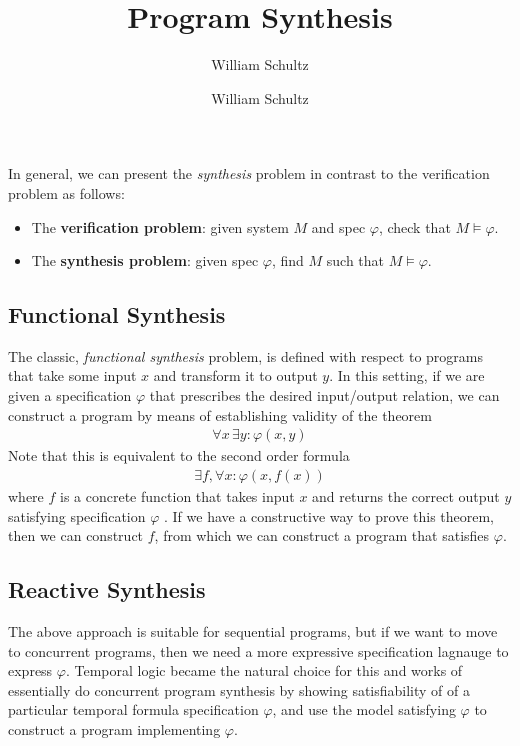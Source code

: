 \documentclass[10pt,a4paper]{article}
\author{William Schultz}
\begin{document}
\title{Program Synthesis}
\author{William Schultz}
\maketitle


In general, we can present the \textit{synthesis} problem in contrast to the verification problem as follows:
\begin{itemize}
    \item The \textbf{verification problem}: given system $M$ and spec $\varphi$, check that $M \vDash \varphi$.
    \item The \textbf{synthesis problem}: given spec $\varphi$, find $M$ such that $M \vDash \varphi$.
\end{itemize}

\subsection{Functional Synthesis}

The classic, \textit{functional synthesis} problem, is defined with respect to programs that take some input $x$ and transform it to output $y$. In this setting, if we are given a specification $\varphi$ that prescribes the desired input/output relation, we can construct a program by means of establishing validity of the theorem
\begin{align*}
    \forall x \, \exists y : \varphi(x,y)
\end{align*}
Note that this is equivalent to the second order formula
\begin{align*}
    \exists f, \forall x : \varphi(x,f(x))
\end{align*}
where $f$ is a concrete function that takes input $x$ and returns the correct output $y$ satisfying specification $\varphi$ \cite{1989pnuelirosner,1969waldingersynthprow}. If we have a constructive way to prove this theorem, then we can construct $f$, from which we can construct a program that satisfies $\varphi$.

\subsection{Reactive Synthesis}

The above approach is suitable for sequential programs, but if we want to move to concurrent programs, then we need a more expressive specification lagnauge to express $\varphi$. Temporal logic became the natural choice for this and works of \cite{1981clarkemerson, 1984mannawolper} essentially do concurrent program synthesis by showing satisfiability of of a particular temporal formula specification $\varphi$, and use the model satisfying $\varphi$ to construct a program implementing $\varphi$.
\end{document}
